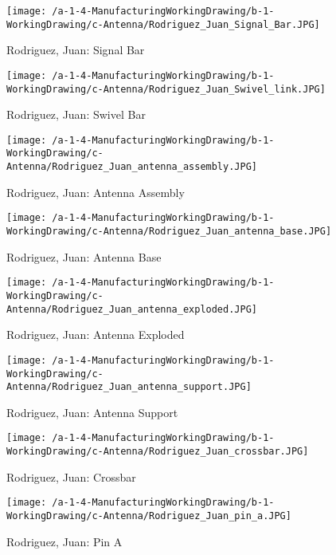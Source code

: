 \begin{figure}[h]
\caption{Rodriguez, Juan: Signal Bar}
\centering
\texttt{[image: /a-1-4-ManufacturingWorkingDrawing/b-1-WorkingDrawing/c-Antenna/Rodriguez\_Juan\_Signal\_Bar.JPG]}
\end{figure}

\begin{figure}[h]
\caption{Rodriguez, Juan: Swivel Bar}
\centering
\texttt{[image: /a-1-4-ManufacturingWorkingDrawing/b-1-WorkingDrawing/c-Antenna/Rodriguez\_Juan\_Swivel\_link.JPG]}
\end{figure}

\begin{figure}[h]
\caption{Rodriguez, Juan: Antenna Assembly}
\centering
\texttt{[image: /a-1-4-ManufacturingWorkingDrawing/b-1-WorkingDrawing/c-Antenna/Rodriguez\_Juan\_antenna\_assembly.JPG]}
\end{figure}

\begin{figure}[h]
\caption{Rodriguez, Juan: Antenna Base}
\centering
\texttt{[image: /a-1-4-ManufacturingWorkingDrawing/b-1-WorkingDrawing/c-Antenna/Rodriguez\_Juan\_antenna\_base.JPG]}
\end{figure}

\begin{figure}[h]
\caption{Rodriguez, Juan:  Antenna Exploded}
\centering
\texttt{[image: /a-1-4-ManufacturingWorkingDrawing/b-1-WorkingDrawing/c-Antenna/Rodriguez\_Juan\_antenna\_exploded.JPG]}
\end{figure}

\begin{figure}[h]
\caption{Rodriguez, Juan:  Antenna Support}
\centering
\texttt{[image: /a-1-4-ManufacturingWorkingDrawing/b-1-WorkingDrawing/c-Antenna/Rodriguez\_Juan\_antenna\_support.JPG]}
\end{figure}

\begin{figure}[h]
\caption{Rodriguez, Juan: Crossbar}
\centering
\texttt{[image: /a-1-4-ManufacturingWorkingDrawing/b-1-WorkingDrawing/c-Antenna/Rodriguez\_Juan\_crossbar.JPG]}
\end{figure}

\begin{figure}[h]
\caption{Rodriguez, Juan: Pin A}
\centering
\texttt{[image: /a-1-4-ManufacturingWorkingDrawing/b-1-WorkingDrawing/c-Antenna/Rodriguez\_Juan\_pin\_a.JPG]}
\end{figure}

